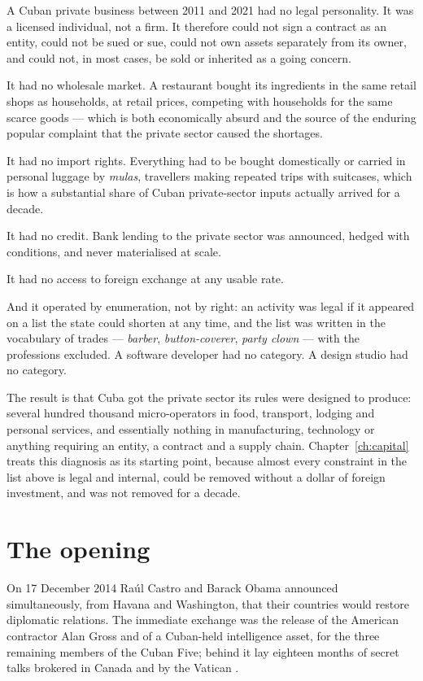 A Cuban private business between 2011 and 2021 had no legal personality. It was
a licensed individual, not a firm. It therefore could not sign a contract as an
entity, could not be sued or sue, could not own assets separately from its
owner, and could not, in most cases, be sold or inherited as a going concern.

It had no wholesale market. A restaurant bought its ingredients in the same
retail shops as households, at retail prices, competing with households for the
same scarce goods --- which is both economically absurd and the source of the
enduring popular complaint that the private sector caused the shortages.

It had no import rights. Everything had to be bought domestically or carried in
personal luggage by \emph{mulas}, travellers making repeated trips with
suitcases, which is how a substantial share of Cuban private-sector inputs
actually arrived for a decade.

It had no credit. Bank lending to the private sector was announced, hedged with
conditions, and never materialised at scale.

It had no access to foreign exchange at any usable rate.

And it operated by enumeration, not by right: an activity was legal if it
appeared on a list the state could shorten at any time, and the list was written
in the vocabulary of trades --- \emph{barber}, \emph{button-coverer},
\emph{party clown} --- with the professions excluded. A software developer had
no category. A design studio had no category.

The result is that Cuba got the private sector its rules were designed to
produce: several hundred thousand micro-operators in food, transport, lodging
and personal services, and essentially nothing in manufacturing, technology or
anything requiring an entity, a contract and a supply chain.
Chapter~\ref{ch:capital} treats this diagnosis as its starting point, because
almost every constraint in the list above is legal and internal, could be
removed without a dollar of foreign investment, and was not removed for a
decade.

\section{The opening}

On 17 December 2014 Ra\'ul Castro and Barack Obama announced simultaneously,
from Havana and Washington, that their countries would restore diplomatic
relations. The immediate exchange was the release of the American contractor
Alan Gross and of a Cuban-held intelligence asset, for the three remaining
members of the Cuban Five; behind it lay eighteen months of secret talks brokered
in Canada and by the Vatican \citep{leogrande2014}.

